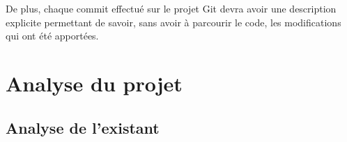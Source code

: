 \documentclass{report}
\begin{document}
De plus, chaque commit effectué sur le projet Git devra avoir une description explicite permettant de savoir, sans avoir à parcourir le code, les modifications qui ont été apportées.\par

\chapter{Analyse du projet}

\section{Analyse de l'existant}


\end{document}
